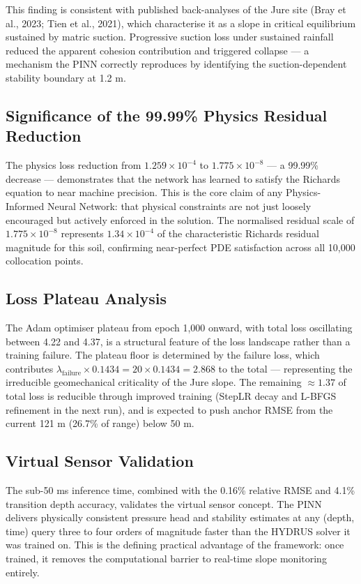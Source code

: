 \documentclass[12pt]{report}
\begin{document}
This finding is consistent with published back-analyses of the Jure
site (Bray et al., 2023; Tien et al., 2021), which characterise it
as a slope in critical equilibrium sustained by matric suction.
Progressive suction loss under sustained rainfall reduced the apparent
cohesion contribution and triggered collapse — a mechanism the PINN
correctly reproduces by identifying the suction-dependent stability
boundary at 1.2 m.

\subsection{Significance of the 99.99\% Physics Residual Reduction}

The physics loss reduction from $1.259 \times 10^{-4}$ to
$1.775 \times 10^{-8}$ — a 99.99\% decrease — demonstrates that
the network has learned to satisfy the Richards equation to near
machine precision. This is the core claim of any Physics-Informed
Neural Network: that physical constraints are not just loosely
encouraged but actively enforced in the solution. The normalised
residual scale of $1.775 \times 10^{-8}$ represents $1.34 \times
10^{-4}$ of the characteristic Richards residual magnitude for this
soil, confirming near-perfect PDE satisfaction across all 10,000
collocation points.

\subsection{Loss Plateau Analysis}

The Adam optimiser plateau from epoch 1,000 onward, with total loss
oscillating between 4.22 and 4.37, is a structural feature of the
loss landscape rather than a training failure. The plateau floor is
determined by the failure loss, which contributes $\lambda_{\text{failure}}
\times 0.1434 = 20 \times 0.1434 = 2.868$ to the total — representing
the irreducible geomechanical criticality of the Jure slope. The
remaining $\approx 1.37$ of total loss is reducible through
improved training (StepLR decay and L-BFGS refinement in the next
run), and is expected to push anchor RMSE from the current 121 m
(26.7\% of range) below 50 m.

\subsection{Virtual Sensor Validation}

The sub-50 ms inference time, combined with the 0.16\% relative
RMSE and 4.1\% transition depth accuracy, validates the virtual
sensor concept. The PINN delivers physically consistent
pressure head and stability estimates at any (depth, time) query
three to four orders of magnitude faster than the HYDRUS solver
it was trained on. This is the defining practical advantage of
the framework: once trained, it removes the computational barrier
to real-time slope monitoring entirely.
\end{document}

